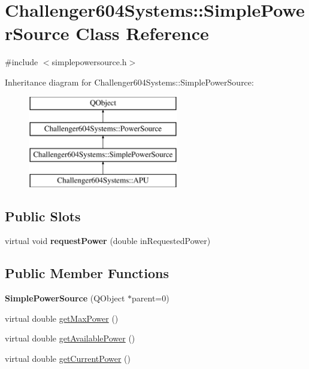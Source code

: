 \hypertarget{class_challenger604_systems_1_1_simple_power_source}{\section{Challenger604\-Systems\-:\-:Simple\-Power\-Source Class Reference}
\label{class_challenger604_systems_1_1_simple_power_source}
}


{\ttfamily \#include $<$simplepowersource.\-h$>$}

Inheritance diagram for Challenger604\-Systems\-:\-:Simple\-Power\-Source\-:\begin{figure}[H]
\begin{center}
\leavevmode
\includegraphics[height=4.000000cm]{class_challenger604_systems_1_1_simple_power_source}
\end{center}
\end{figure}
\subsection*{Public Slots}
\begin{DoxyCompactItemize}
\item 
\hypertarget{class_challenger604_systems_1_1_simple_power_source_a4fdedf92e8411f84df02d4a3b1f8d35a}{virtual void {\bfseries request\-Power} (double in\-Requested\-Power)}\label{class_challenger604_systems_1_1_simple_power_source_a4fdedf92e8411f84df02d4a3b1f8d35a}

\end{DoxyCompactItemize}
\subsection*{Public Member Functions}
\begin{DoxyCompactItemize}
\item 
\hypertarget{class_challenger604_systems_1_1_simple_power_source_aed200c8ab5c16b1f16126c6060ec9e71}{{\bfseries Simple\-Power\-Source} (Q\-Object $\ast$parent=0)}\label{class_challenger604_systems_1_1_simple_power_source_aed200c8ab5c16b1f16126c6060ec9e71}

\item 
virtual double \hyperlink{class_challenger604_systems_1_1_simple_power_source_a9781b84a22264b24438b7e72d8cf35c4}{get\-Max\-Power} ()
\item 
virtual double \hyperlink{class_challenger604_systems_1_1_simple_power_source_af09780bebd7cc1df4a925187b902c78b}{get\-Available\-Power} ()
\item 
virtual double \hyperlink{class_challenger604_systems_1_1_simple_power_source_a5ec0cc41562579550910e2ddb842a324}{get\-Current\-Power} ()
\end{DoxyCompactItemize}
